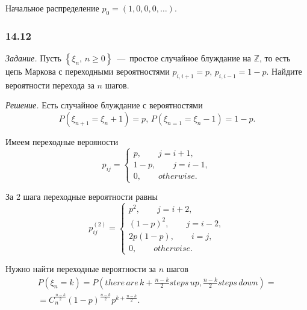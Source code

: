 Начальное распределение $p_0 = \left( 1, 0, 0, 0, \dotsc \right) $.

\subsubsection*{14.12}

\textit{Задание.}
Пусть $ \left\{ \xi_n, \, n \geq 0 \right\} $~---~простое случайное блуждание на $ \mathbb{Z}$,
то есть цепь Маркова с переходными вероятностями $p_{i, i + 1} = p, \, p_{i, i - 1} = 1 - p$.
Найдите вероятности перехода за $n$ шагов.

\textit{Решение.}
Есть случайное блуждание с вероятностями
\begin{equation*}
  P \left( \xi_{n + 1} = \xi_n + 1 \right) = p, \,
  P \left( \xi_{n = 1} = \xi_n - 1 \right) = 1 - p.
\end{equation*}

Имеем переходные верояности
\begin{equation*}
  p_{ij} =
  \begin{cases}
    p, \qquad j = i + 1, \\
    1 - p, \qquad j = i - 1, \\
    0, \qquad otherwise.
  \end{cases}
\end{equation*}

За 2 шага переходные вероятности равны
\begin{equation*}
  p_{ij}^{ \left( 2 \right) } =
  \begin{cases}
    p^2, \qquad j = i + 2, \\
    \left( 1 - p \right)^2, \qquad j = i - 2, \\
    2p \left( 1 - p \right), \qquad i = j, \\
    0, \qquad otherwise.
  \end{cases}
\end{equation*}

Нужно найти переходные вероятности за $n$ шагов
\begin{gather*}
  P \left( \xi_n = k \right) =
  P \left(
    there \, are \, k + \frac{n - k}{2} steps \, up, \frac{n - k}{2} steps \, down
  \right) = \\
  = C_n^{ \frac{n - k}{2}} \left( 1 - p \right)^{ \frac{n - k}{2}} p^{k + \frac{n - k}{2}}.
\end{gather*}
